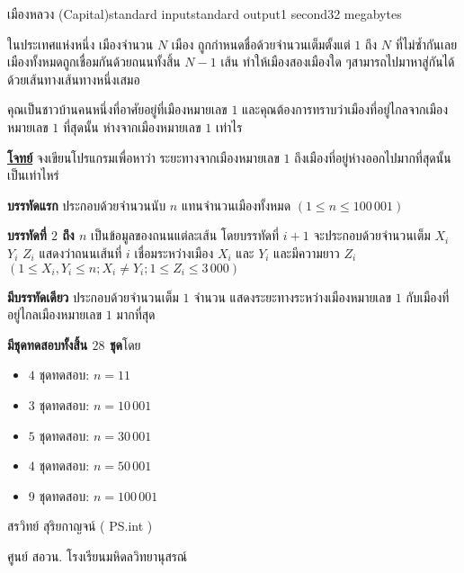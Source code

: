 \documentclass[11pt,a4paper]{article}
\begin{document}
\begin{problem}{เมืองหลวง (Capital)}{standard input}{standard output}{1 second}{32 megabytes}

  ในประเทศแห่งหนึ่ง เมืองจำนวน $N$ เมือง ถูกกำหนดชื่อด้วยจำนวนเต็มตั้งแต่ $1$ ถึง $N$ ที่ไม่ซ้ำกันเลย เมืองทั้งหมดถูกเชื่อมกันด้วยถนนทั้งสิ้น $N-1$ เส้น ทำให้เมืองสองเมืองใด ๆสามารถไปมาหาสู่กันได้ด้วยเส้นทางเส้นทางหนึ่งเสมอ

            คุณเป็นชาวบ้านคนหนึ่งที่อาศัยอยู่ที่เมืองหมายเลข $1$ และคุณต้องการทราบว่าเมืองที่อยู่ไกลจากเมืองหมายเลข $1$ ที่สุดนั้น ห่างจากเมืองหมายเลข $1$ เท่าไร

\bigskip
\underline{\textbf{โจทย์}}  จงเขียนโปรแกรมเพื่อหาว่า ระยะทางจากเมืองหมายเลข $1$ ถึงเมืองที่อยู่ห่างออกไปมากที่สุดนั้นเป็นเท่าไหร่


\InputFile

\textbf{บรรทัดแรก} ประกอบด้วยจำนวนนับ $n$ แทนจำนวนเมืองทั้งหมด $( 1 \leq n \leq 100\,001 )$

\textbf{บรรทัดที่ $2$ ถึง $n$} เป็นข้อมูลของถนนแต่ละเส้น โดยบรรทัดที่ $i+1$ จะประกอบด้วยจำนวนเต็ม $X_i$ $Y_i$ $Z_i$ แสดงว่าถนนเส้นที่ $i$ เชื่อมระหว่างเมือง $X_i$ และ $Y_i$ และมีความยาว $Z_i$  $( 1 \leq X_i,Y_i \leq n ;X_i \neq Y_i ; 1 \leq Z_i \leq 3\,000 )$


\OutputFile

\textbf{มีบรรทัดเดียว} ประกอบด้วยจำนวนเต็ม $1$ จำนวน แสดงระยะทางระหว่างเมืองหมายเลข $1$ กับเมืองที่อยู่ไกลเมืองหมายเลข $1$ มากที่สุด

\Examples

\begin{example}
%
\end{example}
\begin{example}
%
\end{example}

\Scoring

\textbf{มีชุดทดสอบทั้งสิ้น $28$ ชุด}โดย
\begin{itemize}

\item $4$ ชุดทดสอบ: $n = 11$
\item $3$ ชุดทดสอบ: $n = 10\,001$
\item $5$ ชุดทดสอบ: $n = 30\,001$
\item $4$ ชุดทดสอบ: $n = 50\,001$
\item $9$ ชุดทดสอบ: $n = 100\,001$
\end{itemize}

\Source

สรวิทย์  สุริยกาญจน์ ( PS.int )

ศูนย์ สอวน. โรงเรียนมหิดลวิทยานุสรณ์

\end{problem}
\end{document}
